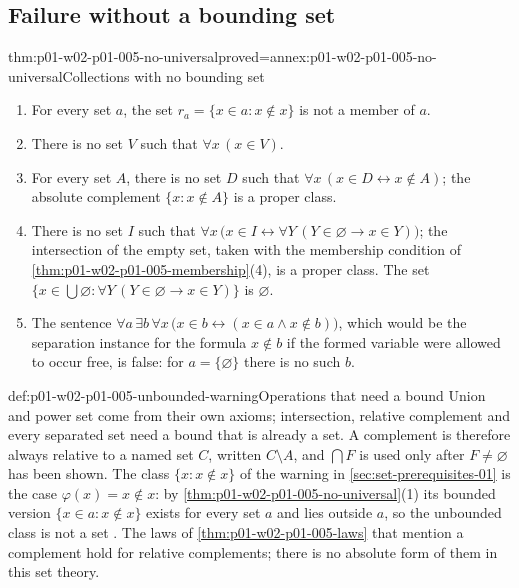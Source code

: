 \subsection{Failure without a bounding set}
\label{sec:p01-w02-p01-005-failure}

\begin{hbtheorem}{thm:p01-w02-p01-005-no-universal}{proved=annex:p01-w02-p01-005-no-universal}{Collections with no bounding set}
\begin{enumerate}
  \item For every set \(a\), the set \(r_a=\{x\in a:x\notin x\}\) is not a
        member of \(a\).
  \item There is no set \(V\) such that \(\forall x\,(x\in V)\).
  \item For every set \(A\), there is no set \(D\) such that
        \(\forall x\,(x\in D\leftrightarrow x\notin A)\); the absolute
        complement \(\{x:x\notin A\}\) is a proper class.
  \item There is no set \(I\) such that
        \(\forall x\,\bigl(x\in I\leftrightarrow\forall Y\,(Y\in\varnothing\to x\in Y)\bigr)\);
        the intersection of the empty set, taken with the membership condition
        of \cref{thm:p01-w02-p01-005-membership}(4), is a proper class. The
        set \(\{x\in\bigcup\varnothing:\forall Y\,(Y\in\varnothing\to x\in Y)\}\)
        is \(\varnothing\).
  \item The sentence
        \(\forall a\,\exists b\,\forall x\,\bigl(x\in b\leftrightarrow(x\in a\land x\notin b)\bigr)\),
        which would be the separation instance for the formula \(x\notin b\)
        if the formed variable were allowed to occur free, is false: for
        \(a=\{\varnothing\}\) there is no such \(b\).
\end{enumerate}
\end{hbtheorem}

\begin{hbwarning}{def:p01-w02-p01-005-unbounded-warning}{Operations that need a bound}
Union and power set come from their own axioms; intersection, relative
complement and every separated set need a bound that is already a set. A
complement is therefore always relative to a named set \(C\), written
\(C\setminus A\), and \(\bigcap F\) is used only after \(F\neq\varnothing\)
has been shown. The class \(\{x:x\notin x\}\) of the warning in
\cref{sec:set-prerequisites-01} is the case \(\varphi(x)=x\notin x\): by
\cref{thm:p01-w02-p01-005-no-universal}(1) its bounded version
\(\{x\in a:x\notin x\}\) exists for every set \(a\) and lies outside \(a\), so
the unbounded class is not a set \cite[ch.~``The Axioms of ZF and ZFC'',
warning ``Unrestricted comprehension'']{FrozenFormalLogicSetOperations}. The
laws of \cref{thm:p01-w02-p01-005-laws} that mention a complement hold for
relative complements; there is no absolute form of them in this set theory.
\end{hbwarning}

